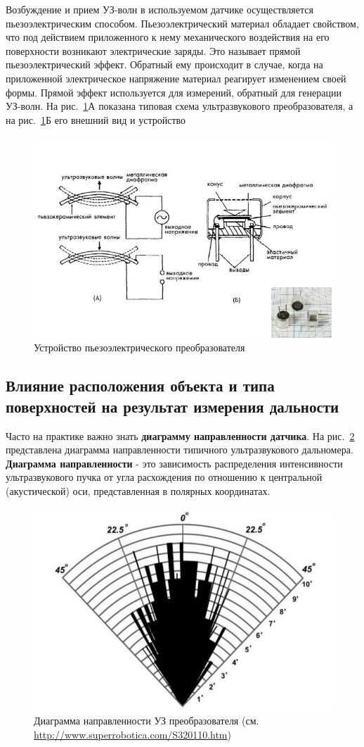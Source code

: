 \documentclass[12pt]{article}
\begin{document}
Возбуждение и прием УЗ-волн в используемом датчике осуществляется пьезоэлектрическим способом. Пьезоэлектрический материал обладает свойством, что под действием приложенного к нему механического воздействия на его поверхности возникают электрические заряды. Это называет прямой пьезоэлектрический эффект. Обратный ему происходит в случае, когда на приложенной электрическое напряжение материал реагирует изменением своей формы. Прямой эффект используется для измерений, обратный для генерации УЗ-волн. На рис.~\ref{fig:screenshot002}А показана типовая схема ультразвукового преобразователя, а на рис.~\ref{fig:screenshot002}Б его внешний вид и устройство

\begin{figure}[H]
	\centering
	\includegraphics[width=0.7\linewidth]{images/screenshot002}
	\caption{Устройство пьезоэлектрического преобразователя}
	\label{fig:screenshot002}
\end{figure}

\subsection{Влияние расположения объекта и типа поверхностей на результат измерения дальности}
Часто на практике важно знать \textbf{диаграмму направленности датчика}. На рис.~\ref{fig:screenshot003} представлена диаграмма направленности типичного ультразвукового дальномера. \textbf{Диаграмма направленности} - это зависимость распределения интенсивности ультразвукового пучка от угла расхождения по отношению к центральной (акустической) оси, представленная в полярных координатах.

\begin{figure}[H]
	\centering
	\includegraphics[width=0.4\linewidth]{images/screenshot003}
	\caption{Диаграмма направленности УЗ преобразователя (см. \url{http://www.superrobotica.com/S320110.htm})}
	\label{fig:screenshot003}
\end{figure}
\end{document}
